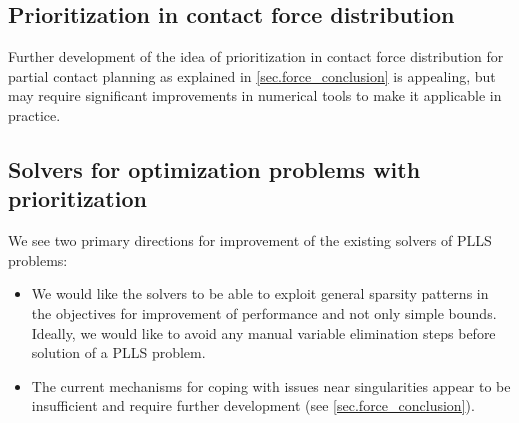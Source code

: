 \subsection{Prioritization in contact force distribution}

Further development of the idea of prioritization in contact force distribution
for partial contact planning as explained in \cref{sec.force_conclusion} is
appealing, but may require significant improvements in numerical tools to make
it applicable in practice.


\subsection{Solvers for optimization problems with prioritization}

We see two primary directions for improvement of the existing solvers of
\acf{PLLS} problems:
%
\begin{itemize}
    \item We would like the solvers to be able to exploit general sparsity
        patterns in the objectives for improvement of performance and not only
        simple bounds. Ideally, we would like to avoid any manual variable
        elimination steps before solution of a \ac{PLLS} problem.

    \item The current mechanisms for coping with issues near singularities
        appear to be insufficient and require further development (see
        \cref{sec.force_conclusion}).
\end{itemize}
